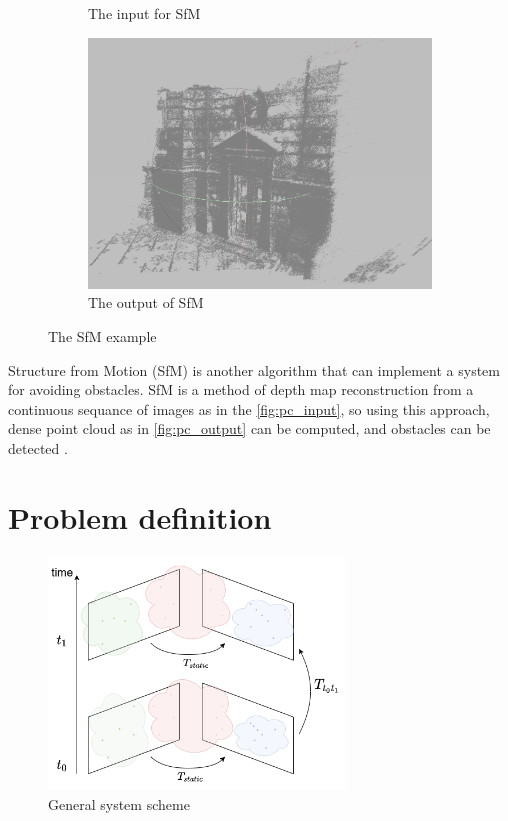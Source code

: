\begin{figure}[h]
\begin{subfigure}[b]{0.31\textwidth}
      \caption{The input for SfM}
      \label{fig:pc_input}
    \end{subfigure}
    \hfill
    \begin{subfigure}[b]{0.65\textwidth}
      \includegraphics[width=\textwidth]{graphics/reconstructed.png}
      \caption{The output of SfM}
      \label{fig:pc_output}
    \end{subfigure}
    \caption{The SfM example}
    \label{fig:pc_recons}
\end{figure}

Structure from Motion (SfM) is another algorithm that can implement a system for avoiding obstacles. 
SfM is a method of depth map reconstruction from a continuous sequance of images as in the \autoref{fig:pc_input}, so using this approach, dense point cloud as in \autoref{fig:pc_output} can be computed, and obstacles can be detected \cite{Lee2008}. 

\section{Problem definition}
\begin{figure}[t]
    \centering
    \includegraphics[width=0.7\textwidth]{graphics/general_scheme.png}
    \caption{General system scheme}
    \label{fig:intro_general}
\end{figure}

